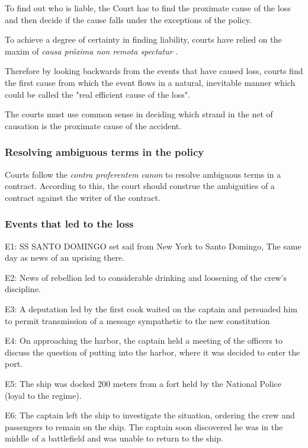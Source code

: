 To find out who is liable, the Court has to find the proximate cause of the loss and then decide if the cause falls under the exceptions of the policy.

To achieve a degree of certainty in finding liability,
courts have relied on the maxim of \textit{causa próxima non remota spectatur}  \cite{marineInsuranceAct55}.

Therefore by looking backwards from the events that have caused loss, courts find the first cause from which the event flows in a natural, inevitable manner which could be called the "real efficient cause of the loss".

The courts must use common sense in deciding which strand in the net of causation is the proximate cause of the accident.

\subsubsection{Resolving ambiguous terms in the policy}

Courts follow the \textit{contra proferentem canon} to resolve ambiguous terms in a contract. According to this, the court should construe the ambiguities of a contract against the writer of the contract. 

\subsubsection{Events that led to the loss}

E1: SS SANTO DOMINGO set sail from New York to Santo Domingo, The same day as news of an uprising there.

E2: News of rebellion led to considerable drinking and loosening of the crew's discipline. 

E3: A deputation led by the first cook waited on the captain and persuaded him to permit transmission of a message sympathetic to the new constitution

E4: On approaching the harbor, the captain held a meeting of the officers to discuss the question of putting into the harbor, where it was decided to enter the port.

E5: The ship was docked 200 meters from a fort held by the National Police (loyal to the regime).

E6: The captain left the ship to investigate the situation, ordering the crew and passengers to remain on the ship. The captain soon discovered he was in the middle of a battlefield and was unable to return to the ship. 


